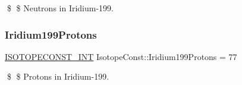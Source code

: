 \$ \$ Neutrons in Iridium-\/199. \mbox{\label{group___isotope_const-_iridium-_ir199_ga2d82ed4c64fce8fc9a899a26290257cf}} 
\subsubsection{\texorpdfstring{Iridium199\+Protons}{Iridium199Protons}}
{\footnotesize\ttfamily \mbox{\hyperlink{group___isotope_const-_macros_ga5f18360b3e99483a35c32d789e62621c}{I\+S\+O\+T\+O\+P\+E\+C\+O\+N\+S\+T\+\_\+\+I\+NT}} Isotope\+Const\+::\+Iridium199\+Protons = 77}

\$ \$ Protons in Iridium-\/199. 